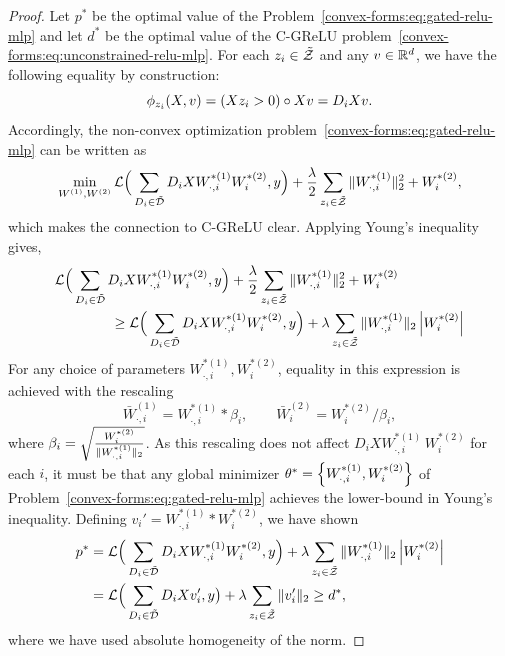 \begin{proof}
    Let \( p^* \) be the optimal value of the Problem~\ref{convex-forms:eq:gated-relu-mlp} and let \( d^* \) be the optimal value of the C-GReLU problem~\eqref{convex-forms:eq:unconstrained-relu-mlp}.
    For each \( z_i \in \tilde {\mathcal{Z}} \) and any \( v \in \mathbb{R}^d \), we have the following equality by construction:
    \[ \phi_{z_i}(X, v) = \left(X z_i > 0\right) \circ X v = D_i X v. \]
    Accordingly, the non-convex optimization problem~\eqref{convex-forms:eq:gated-relu-mlp} can be written as
    \begin{equation}
        \min_{W^{(1)},W^{(2)}} \mathcal{L}\Big(\sum_{D_i \in \tilde {\mathcal{D}} } D_i X W^{*(1)}_{\cdot, i} W^{*(2)}_{i}, y\Big) + \frac{\lambda}{2} \sum_{z_i \in \tilde {\mathcal{Z}}} \|W^{*(1)}_{\cdot, i}\|_2^2 + W^{*(2)}_{i},
    \end{equation}
    which makes the connection to C-GReLU clear.
    Applying Young's inequality gives,
    \begin{align*}
         & \mathcal{L}\Big(\sum_{D_i \in \tilde {\mathcal{D}} } D_i X W^{*(1)}_{\cdot, i} W^{*(2)}_{i}, y\Big) + \frac{\lambda}{2} \sum_{z_i \in \tilde {\mathcal{Z}}} \|W^{*(1)}_{\cdot, i}\|_2^2 + W^{*(2)}_{i}           \\
         & \hspace{4em} \geq \mathcal{L}\Big(\sum_{D_i \in \tilde {\mathcal{D}} } D_i X W^{*(1)}_{\cdot, i} W^{*(2)}_{i}, y\Big) + \lambda \sum_{z_i \in \tilde {\mathcal{Z}}} \|W^{*(1)}_{\cdot, i}\|_2 \left\vert W^{*(2)}_{i}\right\vert
    \end{align*}
    For any choice of parameters \( W^{*(1)}_{\cdot, i}, W^{*(2)}_{i} \), equality in this expression is achieved with the rescaling
    \[
        \bar{W}^{(1)}_{\cdot, i} = W^{*(1)}_{\cdot, i} * \beta_i, \quad \quad \bar{W}^{(2)}_{i} = W^{*(2)}_{i} / \beta_i,
    \]
    where \( \beta_i = \sqrt{\frac{W^{*(2)}_{i}}{\|W^{*(1)}_{\cdot, i}\|_2}} \).
    As this rescaling does not affect \( D_i X W^{*(1)}_{\cdot, i} \, W^{*(2)}_{i} \) for each \( i \), it must be that any global minimizer \( \theta^* = \left\{W^{*(1)}_{\cdot, i}, W^{*(2)}_{i}\right\} \) of Problem~\ref{convex-forms:eq:gated-relu-mlp} achieves the lower-bound in Young's inequality.
    Defining \( v_i' = W^{*(1)}_{\cdot, i} * W^{*(2)}_{i} \), we have shown
    \begin{align*}
        p^*
         & = \mathcal{L}\Big(\sum_{D_i \in \tilde {\mathcal{D}} } D_i X W^{*(1)}_{\cdot, i} W^{*(2)}_{i}, y\Big) + \lambda \sum_{z_i \in \tilde {\mathcal{Z}}} \|W^{*(1)}_{\cdot, i}\|_2 \left\vert W^{*(2)}_{i}\right\vert \\
         & = \mathcal{L}\Big(\sum_{D_i \in \tilde {\mathcal{D}} } D_i X v_i', y \big) + \lambda \sum_{z_i \in \tilde {\mathcal{Z}}} \|v_{i}'\|_2
        \geq d^*,
    \end{align*}
    where we have used absolute homogeneity of the norm.


\end{proof}
